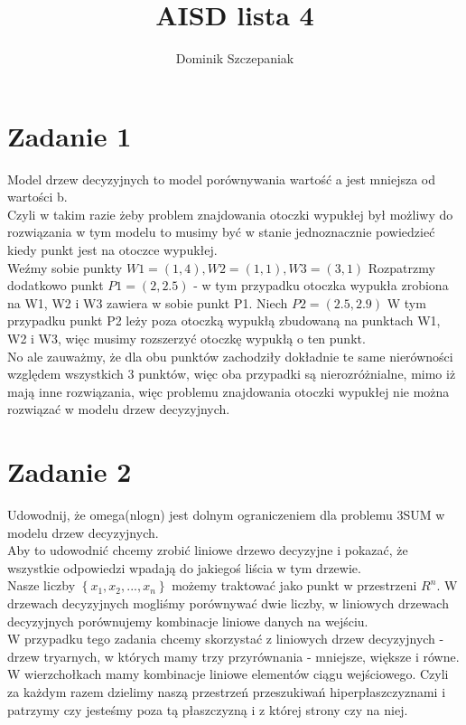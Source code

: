 \documentclass[12pt]{article}
\title{AISD lista 4}
\author{Dominik Szczepaniak}
\newcommand{\set}[1]{\left \{ #1 \right \}}				%
\begin{document}
\maketitle

\bgroup\obeylines

\section{Zadanie 1}
Model drzew decyzyjnych to model porównywania wartość a jest mniejsza od wartości b.\\

Czyli w takim razie żeby problem znajdowania otoczki wypukłej był możliwy do rozwiązania w tym modelu to musimy być w stanie jednoznacznie powiedzieć kiedy punkt jest na otoczce wypukłej.\\

Weźmy sobie punkty $W1 = (1, 4), W2 = (1, 1), W3 = (3, 1)$
Rozpatrzmy dodatkowo punkt $P1 = (2, 2.5)$ - w tym przypadku otoczka wypukła zrobiona na W1, W2 i W3 zawiera w sobie punkt P1.
Niech $P2 = (2.5, 2.9)$
W tym przypadku punkt P2 leży poza otoczką wypukłą zbudowaną na punktach W1, W2 i W3, więc musimy rozszerzyć otoczkę wypukłą o ten punkt. \\

No ale zauważmy, że dla obu punktów zachodziły dokładnie te same nierówności względem wszystkich 3 punktów, więc oba przypadki są nierozróżnialne, mimo iż mają inne rozwiązania, więc problemu znajdowania otoczki wypukłej nie można rozwiązać w modelu drzew decyzyjnych.

\section{Zadanie 2}
Udowodnij, że omega(nlogn) jest dolnym ograniczeniem dla problemu 3SUM w modelu drzew decyzyjnych.\\

Aby to udowodnić chcemy zrobić liniowe drzewo decyzyjne i pokazać, że wszystkie odpowiedzi wpadają do jakiegoś liścia w tym drzewie. \\

Nasze liczby $\set{x_1, x_2, ..., x_n}$ możemy traktować jako punkt w przestrzeni $R^n$.
W drzewach decyzyjnych mogliśmy porównywać dwie liczby, w liniowych drzewach decyzyjnych porównujemy kombinacje liniowe danych na wejściu. \\

W przypadku tego zadania chcemy skorzystać z liniowych drzew decyzyjnych - drzew tryarnych, w których mamy trzy przyrównania - mniejsze, większe i równe. W wierzchołkach mamy kombinacje liniowe elementów ciągu wejściowego. Czyli za każdym razem dzielimy naszą przestrzeń przeszukiwań hiperpłaszczyznami i patrzymy czy jesteśmy poza tą płaszczyzną i z której strony czy na niej. \\
\end{document}
